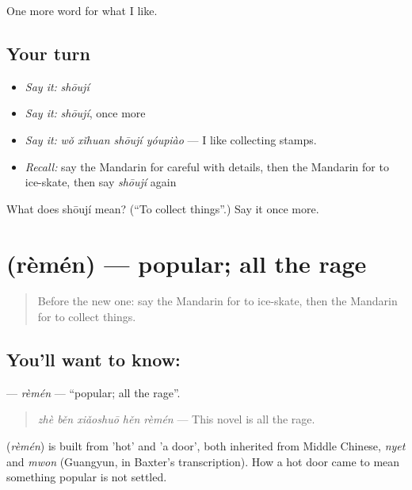 \begin{grammarlens}[title={What you've built}]
One more word for what I like.
\end{grammarlens}

\subsection*{Your turn}
\begin{itemize}
\raggedright
  \item \emph{Say it:} \emph{shōují}
  \item \emph{Say it:} \emph{shōují}, once more
  \item \emph{Say it:} \emph{wǒ xǐhuan shōují yóupiào} — I like collecting stamps.
  \item \emph{Recall:} say the Mandarin for careful with details, then the Mandarin for to ice-skate, then say \emph{shōují} again
\end{itemize}

\begin{tcolorbox}[breakable,colback=teal!4,colframe=teal!35!black,title={Before you move on}]
What does shōují mean? (\textquotedblleft{}To collect things\textquotedblright{}.) Say it once more.
\end{tcolorbox}
\section[\texorpdfstring{\zh{热门} (rèmén)}{热门 (rèmén)}]{ (rèmén) — popular; all the rage}

\label{lesson:ZH-C274-remen}



\begin{quote}
Before the new one: say the Mandarin for to ice-skate, then the Mandarin for to collect things.
\end{quote}

\subsection*{You'll want to know: }
\textbf{} — \emph{rèmén} — \textquotedblleft{}popular; all the rage\textquotedblright{}.

\begin{quote}
\textbf{} \emph{zhè běn xiǎoshuō hěn rèmén} — This novel is all the rage.
\end{quote}

\begin{cousinweb}
\textbf{} (\emph{rèmén}) is built from  'hot' and  'a door', both inherited from Middle Chinese, \emph{nyet} and \emph{mwon} (Guangyun, in Baxter's transcription). How a hot door came to mean something popular is not settled.
\end{cousinweb}

